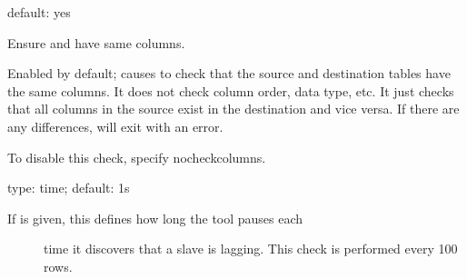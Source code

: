 \documentclass[letterpaper,10pt,english]{sphinxmanual}
\begin{document}
\begin{fulllineitems}
\label{\detokenize{mariadb-archiver:cmdoption-mariadb-archiver-no-check-columns}}
\sphinxAtStartPar
default: yes

\sphinxAtStartPar
Ensure {\hyperref[\detokenize{mariadb-archiver:cmdoption-mariadb-archiver-source}]{}} and {\hyperref[\detokenize{mariadb-archiver:cmdoption-mariadb-archiver-dest}]{}} have same columns.

\sphinxAtStartPar
Enabled by default; causes  to check that the source and destination
tables have the same columns.  It does not check column order, data type, etc.
It just checks that all columns in the source exist in the destination and
vice versa.  If there are any differences,  will exit with an
error.

\sphinxAtStartPar
To disable this check, specify \textendash{}no\sphinxhyphen{}check\sphinxhyphen{}columns.

\end{fulllineitems}


\begin{fulllineitems}
\label{\detokenize{mariadb-archiver:cmdoption-mariadb-archiver-check-interval}}
\sphinxAtStartPar
type: time; default: 1s
\begin{description}
\item[{If {\hyperref[\detokenize{mariadb-archiver:cmdoption-mariadb-archiver-check-slave-lag}]{}} is given, this defines how long the tool pauses each}] \leavevmode
\sphinxAtStartPar
time it discovers that a slave is lagging.
This check is performed every 100 rows.

\end{description}

\end{fulllineitems}
\end{document}
